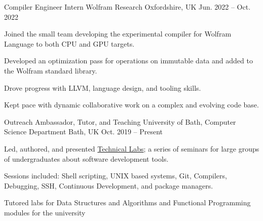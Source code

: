 


\begin{cventries}


\cventry
{Compiler Engineer Intern} %
{Wolfram Research} %
{Oxfordshire, UK} %
{Jun. 2022 -- Oct. 2022} %
{ %
\begin{cvitems}
\item {Joined the small team developing the experimental compiler for Wolfram Language to both CPU and GPU targets.}
\item {Developed an optimization pass for operations on immutable data and added to the Wolfram standard library.}
\item {Drove progress with LLVM, language design, and tooling skills.}
\item {Kept pace with dynamic collaborative work on a complex and evolving code base.}
\end{cvitems}
}


\cventry
{Outreach Ambassador, Tutor, and Teaching} %
{University of Bath, Computer Science Department} %
{Bath, UK} %
{Oct. 2019 -- Present} %
{ %
\begin{cvitems}
\item {Led, authored, and presented \href{https://www.technical-labs.link/notes/2020/}{Technical Labs}; a series of 
  seminars for large groups of undergraduates about software development tools.}
\item {Sessions included: Shell scripting, UNIX based systems, Git, Compilers, Debugging, SSH, Continuous Development, and package managers.}
\item {Tutored labs for Data Structures and Algorithms and Functional Programming modules for the university}
\end{cvitems}
}


\end{cventries}
